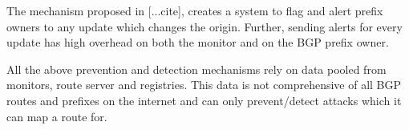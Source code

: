 The mechanism proposed in [...cite], creates a system to flag and alert prefix owners to any update which changes the origin. Further, sending alerts for every update has high overhead on both the monitor and on the BGP prefix owner.  

All the above prevention and detection mechanisms rely on data pooled from monitors, route server and registries. This data is not comprehensive of all BGP routes and prefixes on the internet and can only prevent/detect attacks which it can map a route for.
 
 
